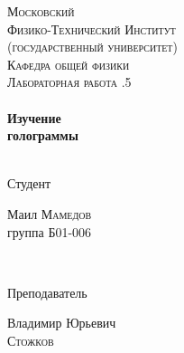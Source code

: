 \begin{titlepage}
\center %
 

\textsc{\LARGE Московский\\[-0.2cm]Физико-Технический Институт\\[0.1cm]\large (государственный университет)}\\[1.5cm] %
\textsc{\Large Кафедра общей физики}\\[0.1cm] %
\textsc{\large Лабораторная работа .5}\\[0.5cm] %


\HRule
\\[0.4cm]
{ \huge \bfseries Изучение\\[0.2cm]
голограммы}
\\[0.6cm] %
\HRule
\\[1.5cm]


 

\begin{minipage}{0.4\textwidth}
	\begin{flushleft} \large
		\textsf{Студент}
		
		Маил \textsc{Мамедов} \\[-0.15cm]
	    группа Б01-006
	\end{flushleft}
\end{minipage}
~
\begin{minipage}{0.4\textwidth}
	\begin{flushright} \large
		\textsf{Преподаватель}
		
	    Владимир Юрьевич \\[-0.15cm]
		\textsc{Стожков} %
	\end{flushright}
\end{minipage}


\end{titlepage}
